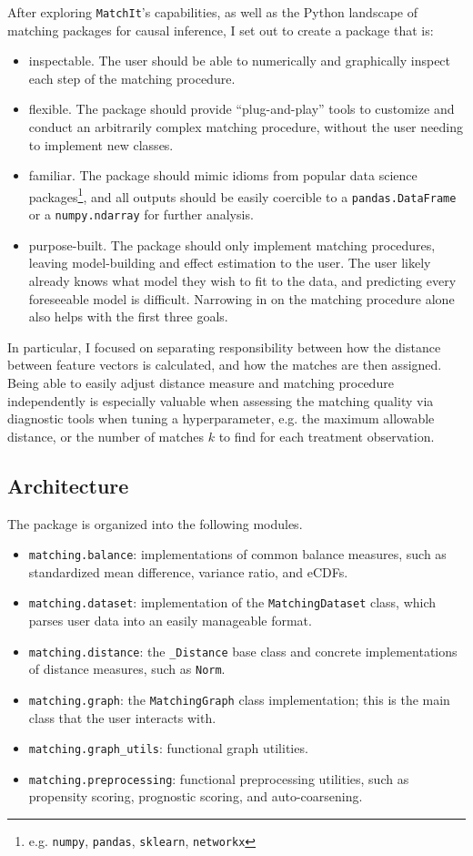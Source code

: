 \documentclass[11pt]{extarticle}
\begin{document}
After exploring \texttt{MatchIt}'s capabilities, as well as the Python landscape of matching packages for causal inference, I set out to create a package that is:
\begin{itemize}
  \item inspectable. The user should be able to numerically and graphically inspect each step of the matching procedure.
  \item flexible. The package should provide ``plug-and-play'' tools to customize and conduct an arbitrarily complex matching procedure, without the user needing to implement new classes.
  \item familiar. The package should mimic idioms from popular data science packages\footnote{e.g. \texttt{numpy}, \texttt{pandas}, \texttt{sklearn}, \texttt{networkx}}, and all outputs should be easily coercible to a \texttt{pandas.DataFrame} or a \texttt{numpy.ndarray} for further analysis.
  \item purpose-built. The package should only implement matching procedures, leaving model-building and effect estimation to the user.
    The user likely already knows what model they wish to fit to the data, and predicting every foreseeable model is difficult.
    Narrowing in on the matching procedure alone also helps with the first three goals.
\end{itemize}
In particular, I focused on separating responsibility between how the distance between feature vectors is calculated, and how the matches are then assigned. Being able to easily adjust distance measure and matching procedure independently is especially valuable when assessing the matching quality via diagnostic tools when tuning a hyperparameter, e.g. the maximum allowable distance, or the number of matches $k$ to find for each treatment observation.

\subsection{Architecture}

The package is organized into the following modules.
\begin{itemize}
  \item \texttt{matching.balance}: implementations of common balance measures, such as standardized mean difference, variance ratio, and eCDFs.
  \item \texttt{matching.dataset}: implementation of the \texttt{MatchingDataset} class, which parses user data into an easily manageable format.
  \item \texttt{matching.distance}: the \texttt{\_Distance} base class and concrete implementations of distance measures, such as \texttt{Norm}.
  \item \texttt{matching.graph}: the \texttt{MatchingGraph} class implementation; this is the main class that the user interacts with.
  \item \texttt{matching.graph\_utils}: functional graph utilities.
  \item \texttt{matching.preprocessing}: functional preprocessing utilities, such as propensity scoring, prognostic scoring, and auto-coarsening.
\end{itemize}
\end{document}
